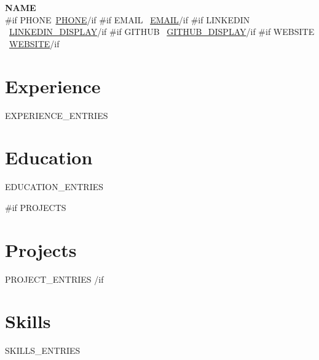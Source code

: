 \documentclass[letterpaper,10.5pt]{article}
\begin{document}
\begin{center}
  {\LARGE\bfseries\color{dark} {{NAME}}} \\[6pt]
  \color{mid}\small
  {{#if PHONE}}\faPhone\ \href{tel:{{PHONE}}}{{{PHONE}}}{{/if}}
  {{#if EMAIL}} \quad \faEnvelope\ \href{mailto:{{EMAIL}}}{{{EMAIL}}}{{/if}}
  {{#if LINKEDIN}} \quad \faLinkedin\ \href{{{LINKEDIN}}}{{{LINKEDIN_DISPLAY}}}{{/if}}
  {{#if GITHUB}} \quad \faGithub\ \href{{{GITHUB}}}{{{GITHUB_DISPLAY}}}{{/if}}
  {{#if WEBSITE}} \quad \faGlobe\ \href{{{WEBSITE}}}{{{WEBSITE}}}{{/if}}
\end{center}

\vspace{4pt}

\section{Experience}
{{EXPERIENCE_ENTRIES}}

\section{Education}
{{EDUCATION_ENTRIES}}

{{#if PROJECTS}}
\section{Projects}
{{PROJECT_ENTRIES}}
{{/if}}

\section{Skills}
\small\color{mid}
{{SKILLS_ENTRIES}}
\end{document}
